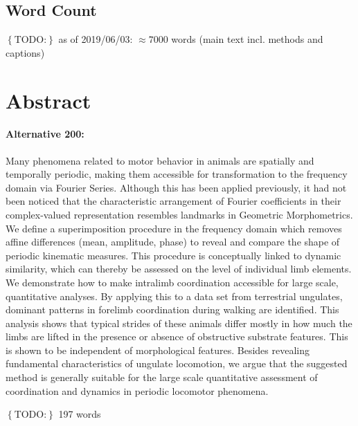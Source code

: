 \documentclass[10pt, a4paper]{article}
\newcommand{\todo}[1]{\colorbox{terracotta!30!yellow}{\footnotesize{$\left\lbrace\text{TODO:}\right\rbrace$ }#1\normalsize}}
\begin{document}
\subsection*{Word Count}
\todo{as of 2019/06/03}: $\approx 7000$ words (main text incl. methods and captions)


\pagebreak
\section*{Abstract}
\paragraph{Alternative 200:}
\begin{linenumbers}[1]
Many phenomena related to motor behavior in animals are spatially and temporally periodic, making them accessible for transformation to the frequency domain via Fourier Series. 
Although this has been applied previously, it had not been noticed that the characteristic arrangement of Fourier coefficients in their complex-valued representation resembles landmarks in Geometric Morphometrics. 
We define a superimposition procedure in the frequency domain which removes affine differences (mean, amplitude, phase) to reveal and compare the shape of periodic kinematic measures. 
This procedure is conceptually linked to dynamic similarity, which can thereby be assessed on the level of individual limb elements. 
We demonstrate how to make intralimb coordination accessible for large scale, quantitative analyses. 
By applying this to a data set from terrestrial ungulates, dominant patterns in forelimb coordination during walking are identified. 
This analysis shows that typical strides of these animals differ mostly in how much the limbs are lifted in the presence or absence of obstructive substrate features. 
This is shown to be independent of morphological features. 
Besides revealing fundamental characteristics of ungulate locomotion, we argue that the suggested method is generally suitable for the large scale quantitative assessment of coordination and dynamics in periodic locomotor phenomena. 
\end{linenumbers} \todo{197 words}
\end{document}
